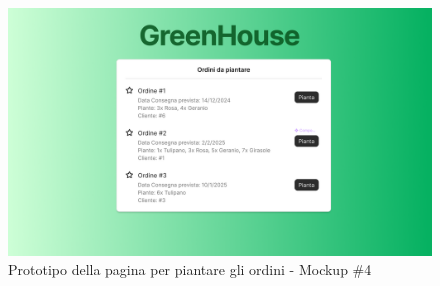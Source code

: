 \documentclass{article}
\begin{document}
\begin{figure}[H]
    \centering
    \includegraphics[scale=0.35]{resources/images/Mockups/mockup_4.png}
    \caption{Prototipo della pagina per piantare gli ordini - Mockup \#4}
    \label{fig:mockup_4}
\end{figure}
\end{document}
